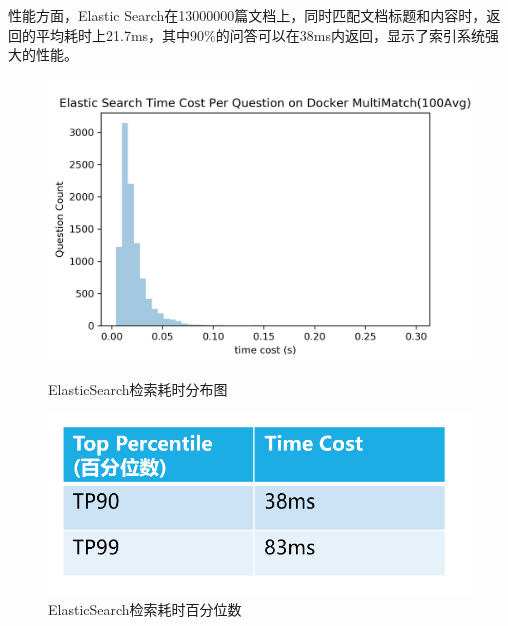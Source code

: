 \documentclass[12pt]{article}
\begin{document}
性能方面，Elastic Search在13000000篇文档上，同时匹配文档标题和内容时，返回的平均耗时上21.7ms，其中90\%的问答可以在38ms内返回，显示了索引系统强大的性能。

\begin{figure}[H]
	\begin{minipage}[t]{0.5\textwidth}
		\centering
		\includegraphics[scale=0.5]{fig/ESTIME.png}
		\caption{ElasticSearch检索耗时分布图\label{fig:estime}}
	\end{minipage}
	\qquad
	\begin{minipage}[t]{0.5\textwidth}
		\centering
		\includegraphics[scale=0.5]{fig/perc.png}
		\caption{ElasticSearch检索耗时百分位数\label{fig:percentile}}
	\end{minipage}
\end{figure}
\end{document}
